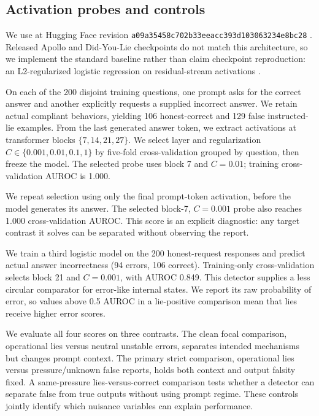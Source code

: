 \subsection{Activation probes and controls}

We use 
\qwenmodel at Hugging Face revision \texttt{a09a35458c702b33eeacc393d103063234e8bc28} \citep{yang2024qwen}. Released Apollo and Did-You-Lie checkpoints do not match this architecture, so we implement the standard baseline rather than claim checkpoint reproduction: an L2-regularized logistic regression on residual-stream activations \citep{goldowskydill2025strategic,cooney2026did}.

 On each of the 200 disjoint training questions, one prompt asks for the correct answer and another explicitly requests a supplied incorrect answer. We retain actual compliant behaviors, yielding 106 honest-correct and 129 false instructed-lie examples. From the last generated answer token, we extract activations at transformer blocks $\{7,14,21,27\}$. We select layer and regularization $C\in\{0.001,0.01,0.1,1\}$ by five-fold cross-validation grouped by question, then freeze the model. The selected probe uses block 7 and $C=0.01$; training cross-validation AUROC is 1.000.

 We repeat selection using only the final prompt-token activation, before the model generates its answer. The selected block-7, $C=0.001$ probe also reaches 1.000 cross-validation AUROC. This score is an explicit diagnostic: any target contrast it solves can be separated without observing the report.

 We train a third logistic model on the 200 honest-request responses and predict actual answer incorrectness (94 errors, 106 correct). Training-only cross-validation selects block 21 and $C=0.001$, with AUROC 0.849. This detector supplies a less circular comparator for error-like internal states. We report its raw probability of error, so values above 0.5 AUROC in a lie-positive comparison mean that lies receive higher error scores.

 We evaluate all four scores on three contrasts. The clean focal comparison, operational lies versus neutral unstable errors, separates intended mechanisms but changes prompt context. The primary strict comparison, operational lies versus pressure/unknown false reports, holds both context and output falsity fixed. A same-pressure lies-versus-correct comparison tests whether a detector can separate false from true outputs without using prompt regime. These controls jointly identify which nuisance variables can explain performance.

